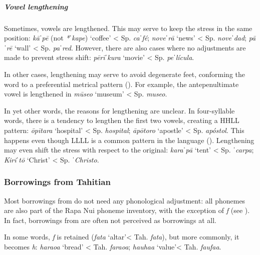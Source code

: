 \subparagraph{Vowel lengthening} Sometimes, vowels are lengthened. This may serve to keep the stress in the same position: \textit{kā}ˈ\textit{pē} (not \textit{*}\textit{ˈ}\textit{kape}) ‘coffee’ {\textless} Sp. \textit{ca}ˈ\textit{fé}; \textit{nove}ˈ\textit{rā} ‘news’ {\textless} Sp. \textit{nove}ˈ\textit{dad}; \textit{pā}ˈ\textit{rē} ‘wall’ {\textless} Sp. \textit{pa}ˈ\textit{red}. However, there are also cases where no adjustments are made to prevent stress shift: \textit{pērī}ˈ\textit{kura} ‘movie’ {\textless} Sp. \textit{pe}ˈ\textit{lícula}.

In other cases, lengthening may serve to avoid degenerate feet, conforming the word to a preferential metrical pattern (). For example, the antepenultimate vowel is lengthened in \textit{mūseo} ‘museum’ {\textless} Sp. \textit{museo}. 

In yet other words, the reasons for lengthening are unclear. In four-syllable words, there is a tendency to lengthen the first two vowels, creating a HHLL pattern: \textit{{\ꞌ}ōpītara} ‘hospital’ {\textless} Sp. \textit{hospital}; \textit{{\ꞌ}āpōtoro} ‘apostle’ {\textless} Sp. \textit{apóstol}. This happens even though LLLL is a common pattern in the language (). Lengthening may even shift the stress with respect to the  original: \textit{kara}ˈ\textit{pā} ‘tent’ {\textless} Sp. ˈ\textit{carpa}; \textit{Kiri}ˈ\textit{tō} ‘Christ’ {\textless} Sp. ˈ\textit{Christo}. 

\subsubsection[Borrowings from \ili{Tahitian}]{Borrowings from Tahitian}\label{sec:2.5.3.2}
Most borrowings from  do not need any phonological adjustment: all  phonemes are also part of the Rapa Nui phoneme inventory, with the exception of \textit{f} (see ). In fact, borrowings from  are often not perceived as borrowings at all. 

In some words, \textit{f} is retained (\textit{fata} ‘altar’{\textless} Tah. \textit{fata}), but more commonly, it becomes \textit{h}: \textit{haraoa} ‘bread’ {\textless} Tah. \textit{faraoa}; \textit{hauha}\textit{{\ꞌ}a} ‘value’{\textless} Tah. \textit{faufa{\ꞌ}a}.


